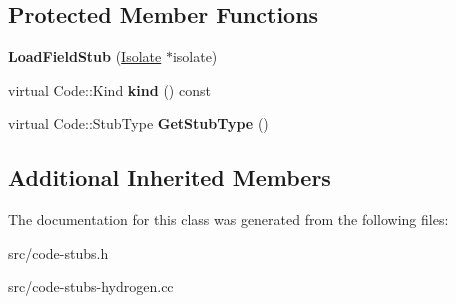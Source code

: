 \subsection*{Protected Member Functions}
\begin{DoxyCompactItemize}
\item 
\hypertarget{classv8_1_1internal_1_1_load_field_stub_abf088e2fd4cfa5f16de5e85e038a13bf}{}{\bfseries Load\+Field\+Stub} (\hyperlink{classv8_1_1internal_1_1_isolate}{Isolate} $\ast$isolate)\label{classv8_1_1internal_1_1_load_field_stub_abf088e2fd4cfa5f16de5e85e038a13bf}

\item 
\hypertarget{classv8_1_1internal_1_1_load_field_stub_a04eafb51ab3be67e4e8aa014cf681283}{}virtual Code\+::\+Kind {\bfseries kind} () const \label{classv8_1_1internal_1_1_load_field_stub_a04eafb51ab3be67e4e8aa014cf681283}

\item 
\hypertarget{classv8_1_1internal_1_1_load_field_stub_a019e66caa406ae74aca5470068f59c1c}{}virtual Code\+::\+Stub\+Type {\bfseries Get\+Stub\+Type} ()\label{classv8_1_1internal_1_1_load_field_stub_a019e66caa406ae74aca5470068f59c1c}

\end{DoxyCompactItemize}
\subsection*{Additional Inherited Members}


The documentation for this class was generated from the following files\+:\begin{DoxyCompactItemize}
\item 
src/code-\/stubs.\+h\item 
src/code-\/stubs-\/hydrogen.\+cc\end{DoxyCompactItemize}
